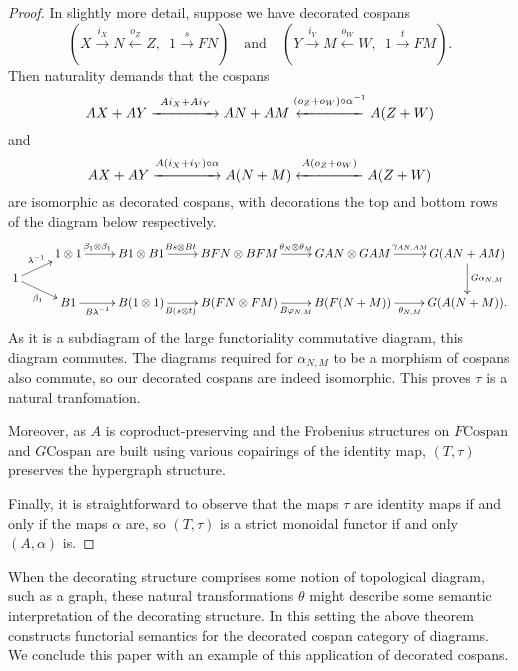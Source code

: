 \begin{proof}
In slightly more detail, suppose we have decorated cospans
\[
  (X \stackrel{i_X}\longrightarrow N
\stackrel{o_Z}\longleftarrow Z,\enspace 1 \stackrel{s}\longrightarrow FN) \quad
\textrm{and} \quad (Y \stackrel{i_Y}\longrightarrow M
\stackrel{o_W}\longleftarrow W,\enspace 1 \stackrel{t}\longrightarrow FM).
\]
Then naturality demands that the cospans
\[
 AX+AY \stackrel{Ai_X+Ai_Y}{\xrightarrow{\hspace*{1.5cm}}} AN+AM
 \stackrel{(o_Z+o_W)\circ\alpha^{-1}}{\xleftarrow{\hspace*{1.5cm}}} A(Z+W)
\]
and
\[
 AX+AY \stackrel{A(i_X+i_Y)\circ\alpha}{\xrightarrow{\hspace*{1.5cm}}} A(N+M)
 \stackrel{A(o_Z+o_W)}{\xleftarrow{\hspace*{1.5cm}}} A(Z+W)
\]
are isomorphic as decorated cospans, with decorations the top and bottom rows of
the diagram below respectively.
\[
  \xymatrixrowsep{0.5pc}
  \xymatrix{
    & 1 \otimes 1 \ar[r]^(.4){\beta_1 \otimes \beta_1} & B1 \otimes B1 \ar[r]^(.4){Bs
    \otimes Bt} & BFN \otimes BFM \ar[r]^{\theta_N \otimes \theta_M} & GAN \otimes
    GAM \ar[r]^{\gamma_{AN,AM}} & G(AN+AM) \ar[dd]^{G\alpha_{N,M}} \\
    1 \ar[ur]^{\lambda^{-1}} \ar[dr]_{\beta_1} \\
    & B1 \ar[r]_(.4){B\lambda^{-1}} & B(1 \otimes 1) \ar[r]_(.4){B(s\otimes t)} & B(FN
    \otimes FM) \ar[r]_{B\varphi_{N,M}} & B(F(N+M))
    \ar[r]_{\theta_{N,M}} & G(A(N+M)).
  }
\]
As it is a subdiagram of the large functoriality commutative diagram, this
diagram commutes. The diagrams required for $\alpha_{N,M}$ to be a morphism of
cospans also commute, so our decorated cospans are indeed isomorphic. This
proves $\tau$ is a natural tranfomation.  
  
  Moreover, as $A$ is
  coproduct-preserving and the Frobenius structures on $F\mathrm{Cospan}$ and
  $G\mathrm{Cospan}$ are built using various copairings of the identity map,
  $(T,\tau)$ preserves the hypergraph structure.

  Finally, it is straightforward to observe that the maps $\tau$ are identity
  maps if and only if the maps $\alpha$ are, so $(T,\tau)$ is a strict monoidal
  functor if and only $(A,\alpha)$ is.
\end{proof}

When the decorating structure comprises some notion of topological diagram, such
as a graph, these natural transformations $\theta$ might describe some semantic
interpretation of the decorating structure. In this setting the above theorem
constructs functorial semantics for the decorated cospan category of diagrams.
We conclude this paper with an example of this application of decorated cospans.


